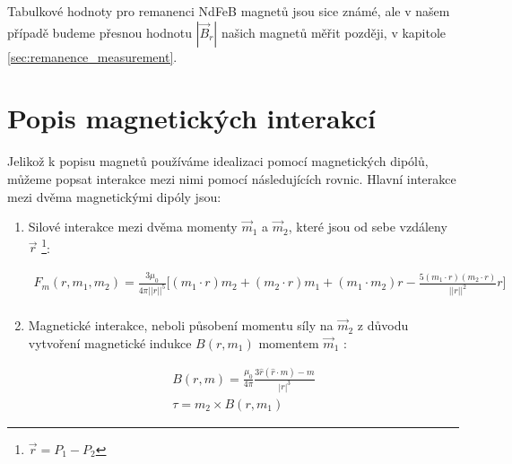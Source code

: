 \documentclass[12pt, a4paper,
 twoside,        %
 openright
]{report}
\begin{document}
Tabulkové hodnoty pro remanenci NdFeB magnetů jsou sice známé, ale v našem případě budeme přesnou hodnotu $|\vec{B}_r|$ našich magnetů měřit později, v kapitole \ref{sec:remanence_measurement}.

\section{Popis magnetických interakcí}

Jelikož k popisu magnetů používáme idealizaci pomocí magnetických dipólů, můžeme popsat interakce mezi nimi pomocí následujících rovnic.
Hlavní interakce mezi dvěma magnetickými dipóly jsou:
\begin{enumerate}[topsep=0pt, partopsep=0pt]
    \setlength{\itemsep}{0pt}%
    \setlength{\parskip}{0pt}%

    \item Silové interakce \cite{magnetic_force} mezi dvěma momenty $\vec{m}_1$ a $\vec{m}_2$, které jsou od sebe vzdáleny $\vec{r}$ \footnote{$\vec{r} = P_1 - P_2$}:

          \begin{equation}
              \label{eq:F_m}
              \begin{split}
                  F_m (r,m_1,m_2) = \frac{3\mu_0}{4\pi ||r||^5}
                  \bigg[
                      (m_1\cdot r) m_2 +
                      (m_2\cdot r) m_1 +
                      (m_1\cdot m_2) r -
                      \frac{5(m_1\cdot r)(m_2\cdot r)}{||r||^2} r
                      \bigg] \\
              \end{split}
          \end{equation}

    \item Magnetické interakce, neboli působení momentu síly \cite{magnetic_torque} na $\vec{m}_2$ z důvodu vytvoření magnetické indukce $B(r, m_1)$ momentem $\vec{m}_1$ \cite{magnetic_force}:

          \begin{equation}
              \label{eq:B}
              \begin{split}
                  B (r, m) = \frac{\mu_0}{4\pi}\frac{3 \hat{r}(\hat{r}\cdot m) - m}{|r|^3} \\
                  \tau = m_2 \times B(r, m_1)
              \end{split}
          \end{equation}
\end{enumerate}
\end{document}
